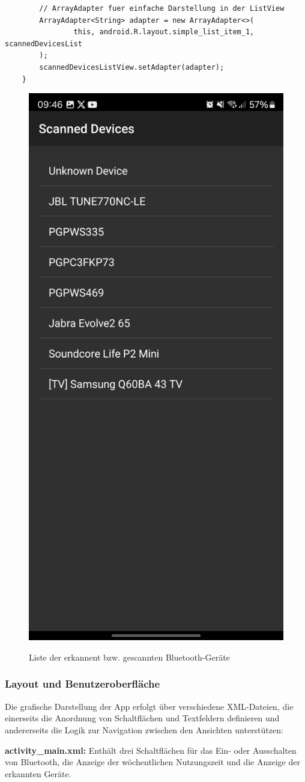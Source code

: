 \documentclass[a4paper, 12pt]{article} %
\begin{document}
\begin{spacing}{1.8}
\begin{lstlisting}
        // ArrayAdapter fuer einfache Darstellung in der ListView
        ArrayAdapter<String> adapter = new ArrayAdapter<>(
                this, android.R.layout.simple_list_item_1, scannedDevicesList
        );
        scannedDevicesListView.setAdapter(adapter);
    }
    \end{lstlisting}

    \begin{figure}[H]
        \includegraphics[width=0.5\linewidth]{images/Screenshot_20250113_094607_Bluetooth App.jpg}\\[1ex]
        \centering
        \caption{Liste der erkannent bzw. gescannten Bluetooth-Geräte\cite{lukiano12_lkw_assist}}
        \label{ABBILDUNG 76}
    \end{figure}

\subsubsection{Layout und Benutzeroberfläche}
Die grafische Darstellung der App erfolgt über verschiedene XML-Dateien, die einerseits die Anordnung von Schaltflächen und Textfeldern definieren und andererseits die 
Logik zur Navigation zwischen den Ansichten unterstützen:

\textbf{activity\_main.xml\cite{lukiano12_lkw_assist}:} Enthält drei Schaltflächen für das Ein- oder Ausschalten von Bluetooth, die Anzeige der wöchentlichen Nutzungszeit und die Anzeige der erkannten Geräte.


\end{spacing}
\end{document}
